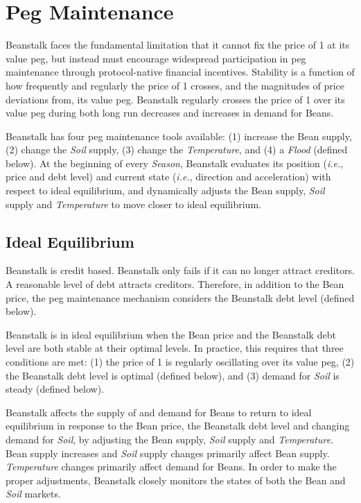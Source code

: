 \documentclass[tikz]{article}
\newcommand{\term}[1]{\textsl{#1}}
\newcommand{\Bean}{} %
\begin{document}
\section{Peg Maintenance}
Beanstalk faces the fundamental limitation that it cannot fix the price of \Bean1 at its value peg, but instead must encourage widespread participation in peg maintenance through protocol-native financial incentives. Stability is a function of how frequently and regularly the price of \Bean1 crosses, and the magnitudes of price deviations from, its value peg. Beanstalk regularly crosses the price of \Bean1 over its value peg during both long run decreases and increases in demand for Beans.

Beanstalk has four peg maintenance tools available: (1) increase the Bean supply, (2) change the \term{Soil} supply, (3) change the \term{Temperature}, and (4) a \term{Flood} (defined below). At the beginning of every \term{Season}, Beanstalk evaluates its position (\term{i.e.}, price and debt level) and current state (\term{i.e.}, direction and acceleration) with respect to ideal equilibrium, and dynamically adjusts the Bean supply, \term{Soil} supply and \term{Temperature} to move closer to ideal equilibrium.

\vspace*{-3mm}
\subsection{Ideal Equilibrium}
\vspace*{-1mm}
Beanstalk is credit based. Beanstalk only fails if it can no longer attract creditors. A reasonable level of debt attracts creditors. Therefore, in addition to the Bean price, the peg maintenance mechanism considers the Beanstalk debt level (defined below). 

Beanstalk is in ideal equilibrium when the Bean price and the Beanstalk debt level are both stable at their optimal levels. In practice, this requires that three conditions are met: (1) the price of \Bean1 is regularly oscillating over its value peg, (2) the Beanstalk debt level is optimal (defined below), and (3) demand for \term{Soil} is steady (defined below). 

Beanstalk affects the supply of and demand for Beans to return to ideal equilibrium in response to the Bean price, the Beanstalk debt level and changing demand for \term{Soil}, by adjusting the Bean supply, \term{Soil} supply and \term{Temperature}. Bean supply increases and \term{Soil} supply changes primarily affect Bean supply. \term{Temperature} changes primarily affect demand for Beans. In order to make the proper adjustments, Beanstalk closely monitors the states of both the Bean and \term{Soil} markets.
\end{document}
